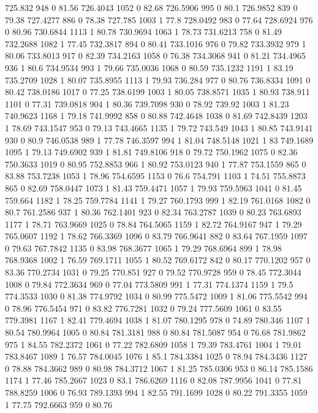 725.832	948	0	81.56
726.4043	1052	0	82.68
726.5906	995	0	80.1
726.9852	839	0	79.38
727.4277	886	0	78.38
727.785	1003	1	77.8
728.0492	983	0	77.64
728.6924	976	0	80.96
730.6844	1113	1	80.78
730.9694	1063	1	78.73
731.6213	758	0	81.49
732.2688	1082	1	77.45
732.3817	894	0	80.41
733.1016	976	0	79.82
733.3932	979	1	80.06
733.8013	917	0	82.39
734.2163	1058	0	76.38
734.3068	941	0	81.21
734.4965	936	1	80.6
734.9534	993	1	79.66
735.0036	1068	0	80.59
735.1232	1191	1	83.19
735.2709	1028	1	80.07
735.8955	1113	1	79.93
736.284	977	0	80.76
736.8334	1091	0	80.42
738.0186	1017	0	77.25
738.6199	1003	1	80.05
738.8571	1035	1	80.93
738.911	1101	0	77.31
739.0818	904	1	80.36
739.7098	930	0	78.92
739.92	1003	1	81.23
740.9623	1168	1	79.18
741.9992	858	0	80.88
742.4648	1038	0	81.69
742.8439	1203	1	78.69
743.1547	953	0	79.13
743.4665	1135	1	79.72
743.549	1043	1	80.85
743.9141	930	0	80.9
746.0538	989	1	77.78
746.3597	994	1	81.04
748.5148	1021	1	83
749.1689	1095	1	79.13
749.6902	939	1	81.81
749.8106	918	0	79.72
750.1962	1075	0	82.36
750.3633	1019	0	80.95
752.8853	966	1	80.92
753.0123	940	1	77.87
753.1559	865	0	83.88
753.7238	1053	1	78.96
754.6595	1153	0	76.6
754.791	1103	1	74.51
755.8873	865	0	82.69
758.0447	1073	1	81.43
759.4471	1057	1	79.93
759.5963	1041	0	81.45
759.664	1182	1	78.25
759.7784	1141	1	79.27
760.1793	999	1	82.19
761.0168	1082	0	80.7
761.2586	937	1	80.36
762.1401	923	0	82.34
763.2787	1039	0	80.23
763.6893	1177	1	78.71
763.9669	1025	0	78.84
764.5065	1159	1	82.72
764.9167	947	1	79.29
765.0607	1192	1	78.62
766.3369	1096	0	83.79
766.9641	882	0	83.64
767.1959	1097	0	79.63
767.7842	1135	0	83.98
768.3677	1065	1	79.29
768.6964	899	1	78.98
768.9368	1002	1	76.59
769.1711	1055	1	80.52
769.6172	842	0	80.17
770.1202	957	0	83.36
770.2734	1031	0	79.25
770.851	927	0	79.52
770.9728	959	0	78.45
772.3044	1008	0	79.84
772.3634	969	0	77.04
773.5809	991	1	77.31
774.1374	1159	1	79.5
774.3533	1030	0	81.38
774.9792	1034	0	80.99
775.5472	1009	1	81.06
775.5542	994	0	78.96
776.5454	971	0	83.82
776.7281	1032	0	79.24
777.5609	1061	0	83.55
779.3981	1167	1	82.41
779.4694	1038	1	81.07
780.1295	978	0	74.89
780.346	1107	1	80.54
780.9964	1005	0	80.84
781.3181	988	0	80.84
781.5087	954	0	76.68
781.9862	975	1	84.55
782.2372	1061	0	77.22
782.6809	1058	1	79.39
783.4761	1004	1	79.01
783.8467	1089	1	76.57
784.0045	1076	1	85.1
784.3384	1025	0	78.94
784.3436	1127	0	78.88
784.3662	989	0	80.98
784.3712	1067	1	81.25
785.0306	953	0	86.14
785.1586	1174	1	77.46
785.2667	1023	0	83.1
786.6269	1116	0	82.08
787.9956	1041	0	77.81
788.8259	1006	0	76.93
789.1393	994	1	82.55
791.1699	1028	0	80.22
791.3355	1059	1	77.75
792.6663	959	0	80.76
